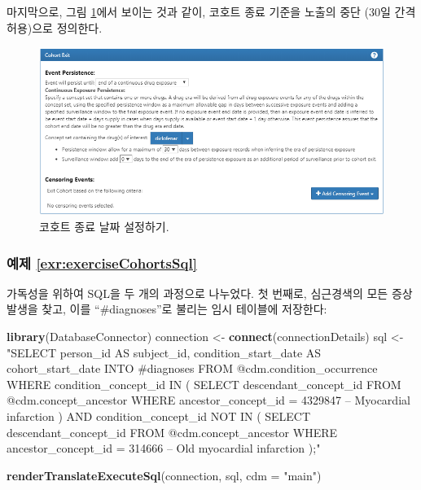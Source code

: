 \documentclass[10.5pt]{book}
\newenvironment{Shaded}{\begin{snugshade}}{\end{snugshade}}
\newcommand{\KeywordTok}[1]{\textcolor[rgb]{0.13,0.29,0.53}{\textbf{#1}}}
\newcommand{\DataTypeTok}[1]{\textcolor[rgb]{0.13,0.29,0.53}{#1}}
\newcommand{\StringTok}[1]{\textcolor[rgb]{0.31,0.60,0.02}{#1}}
\newcommand{\NormalTok}[1]{#1}
\theoremstyle{definition}
\theoremstyle{definition}
\theoremstyle{definition}
\theoremstyle{remark}
\begin{document}
마지막으로, 그림 \ref{fig:cohortsAtlasExit}에서 보이는 것과 같이, 코호트
종료 기준을 노출의 중단 (30일 간격 허용)으로 정의한다.

\begin{figure}

{\centering \includegraphics[width=1\linewidth]{images/SuggestedAnswers/cohortsAtlasExit} 

}

\caption{코호트 종료 날짜 설정하기.}\label{fig:cohortsAtlasExit}
\end{figure}

\subsubsection*{예제
\ref{exr:exerciseCohortsSql}}\label{-refexrexercisecohortssql}

가독성을 위하여 SQL을 두 개의 과정으로 나누었다. 첫 번째로, 심근경색의
모든 증상 발생을 찾고, 이를 ``\#diagnoses''로 불리는 임시 테이블에
저장한다:

\begin{Shaded}
\begin{Highlighting}[]
\KeywordTok{library}\NormalTok{(DatabaseConnector)}
\NormalTok{connection <-}\StringTok{ }\KeywordTok{connect}\NormalTok{(connectionDetails)}
\NormalTok{sql <-}\StringTok{ "SELECT person_id AS subject_id,}
\StringTok{  condition_start_date AS cohort_start_date}
\StringTok{INTO #diagnoses}
\StringTok{FROM @cdm.condition_occurrence}
\StringTok{WHERE condition_concept_id IN (}
\StringTok{    SELECT descendant_concept_id}
\StringTok{    FROM @cdm.concept_ancestor}
\StringTok{    WHERE ancestor_concept_id = 4329847 -- Myocardial infarction}
\StringTok{)}
\StringTok{  AND condition_concept_id NOT IN (}
\StringTok{    SELECT descendant_concept_id}
\StringTok{    FROM @cdm.concept_ancestor}
\StringTok{    WHERE ancestor_concept_id = 314666 -- Old myocardial infarction}
\StringTok{);"}

\KeywordTok{renderTranslateExecuteSql}\NormalTok{(connection, sql, }\DataTypeTok{cdm =} \StringTok{"main"}\NormalTok{)}
\end{Highlighting}
\end{Shaded}
\end{document}
